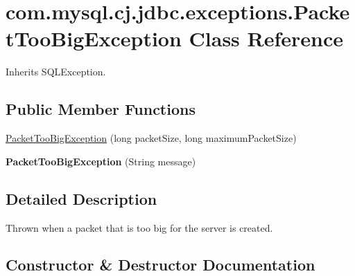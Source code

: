 \hypertarget{classcom_1_1mysql_1_1cj_1_1jdbc_1_1exceptions_1_1_packet_too_big_exception}{}\section{com.\+mysql.\+cj.\+jdbc.\+exceptions.\+Packet\+Too\+Big\+Exception Class Reference}
\label{classcom_1_1mysql_1_1cj_1_1jdbc_1_1exceptions_1_1_packet_too_big_exception}


Inherits S\+Q\+L\+Exception.

\subsection*{Public Member Functions}
\begin{DoxyCompactItemize}
\item 
\mbox{\hyperlink{classcom_1_1mysql_1_1cj_1_1jdbc_1_1exceptions_1_1_packet_too_big_exception_a2bc6304fec19a835419b191e67dd63b6}{Packet\+Too\+Big\+Exception}} (long packet\+Size, long maximum\+Packet\+Size)
\item 
\mbox{\label{classcom_1_1mysql_1_1cj_1_1jdbc_1_1exceptions_1_1_packet_too_big_exception_a41b9ee069f0dab7d92c1ff0be161f0fd}} 
{\bfseries Packet\+Too\+Big\+Exception} (String message)
\end{DoxyCompactItemize}


\subsection{Detailed Description}
Thrown when a packet that is too big for the server is created. 

\subsection{Constructor \& Destructor Documentation}
\mbox{\label{classcom_1_1mysql_1_1cj_1_1jdbc_1_1exceptions_1_1_packet_too_big_exception_a2bc6304fec19a835419b191e67dd63b6}} 
